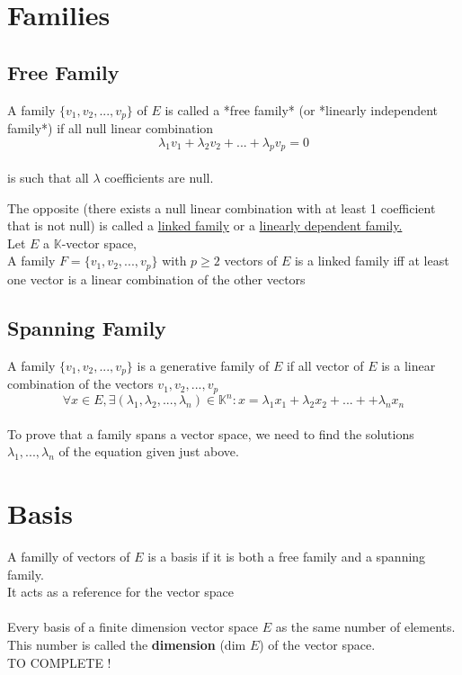 \documentclass[notitlepage]{math}
\begin{document}
\section{Families}
\subsection{Free Family}
A family $\{v_1,v_2,...,v_p\}$  of $E$ is called a *free family*  (or *linearly independent family*) if all null linear combination\\
\[\lambda_1v_1 + \lambda_2v_2 + ... + \lambda_pv_p = 0\]\\
is such that all $\lambda$ coefficients are null.

The opposite (there exists a null linear combination with at least 1 coefficient that is not null) is called a \underline{linked family} or a \underline{linearly dependent family.}\\

Let $E$ a $\mathbb{K}$-vector space,\\
A family $F = \{v_1,v_2,...,v_p\}$  with $p \geq 2$ vectors of $E$ is a linked family iff at least one vector is a linear combination of the other vectors

\subsection{Spanning Family}
A family $\{v_1,v_2,...,v_p\} $ is a generative family of $E$ if all vector of $E$ is a linear combination of the vectors $v_1,v_2,...,v_p$ \\
\[\forall x \in E, \exists (\lambda_1,\lambda_2,...,\lambda_n) \in \mathbb{K}^n: x =\lambda_1x_1 + \lambda_2x_2 + ... + + \lambda_nx_n\]\\
To prove that a family spans a vector space, we need to find the solutions $\lambda_1,...,\lambda_n$ of the equation given just above.

\section{Basis}
A familly of vectors of $E$ is a basis if it is both a free family and a spanning family.\\
It acts as a reference for the vector space\\\\
Every basis of a finite dimension vector space $E$ as the same number of elements. This number is called the \textbf{dimension} (dim $E$) of the vector space.\\
TO COMPLETE !
\end{document}
